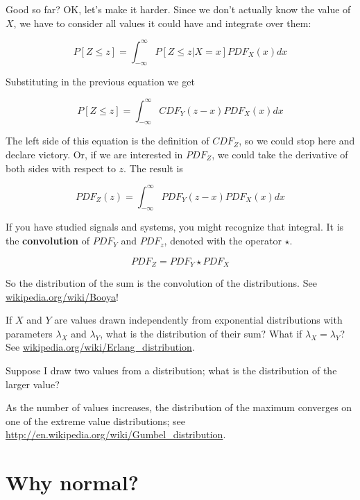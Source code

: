 \documentclass[12pt]{book}
\begin{document}
Good so far?  OK, let's make it harder.  Since we don't actually know
the value of $X$, we have to consider all values it could have and
integrate over them:

\newcommand{\infint}{\int_{-\infty}^{\infty}}

\[ P[Z \le z] = \infint P[Z \le z | X = x] PDF_X(x) dx \]

Substituting in the previous equation we get

\[ P[Z \le z] = \infint CDF_Y(z-x) PDF_X(x) dx \]

The left side of this equation is the definition of
$CDF_Z$, so we could stop here and declare victory.  Or, if
we are interested in $PDF_Z$, we could take the derivative of
both sides with respect to $z$.  The result is

\[ PDF_Z(z) = \infint PDF_Y(z-x) PDF_X(x) dx  \]

\newcommand{\convolution}{\star}

If you have studied signals and systems, you might recognize that
integral.  It is the {\bf convolution} of $PDF_Y$ and $PDF_z$, denoted
with the operator $\convolution$.

\[ PDF_Z = PDF_Y \convolution PDF_X \]

So the distribution of the sum is the convolution of the distributions.
See \url{wikipedia.org/wiki/Booya}!

\begin{ex}

If $X$ and $Y$ are values drawn independently from exponential
distributions with parameters $\lambda_X$ and $\lambda_Y$, what is the
distribution of their sum?  What if $\lambda_X = \lambda_Y$?
See \url{wikipedia.org/wiki/Erlang_distribution}.

\end{ex}

\begin{ex}

Suppose I draw two values from a distribution; what is the distribution
of the larger value?

As the number of values increases, the distribution of the maximum
converges on one of the extreme value distributions; see
\url{http://en.wikipedia.org/wiki/Gumbel_distribution}.

\end{ex}



\section{Why normal?}
\end{document}
